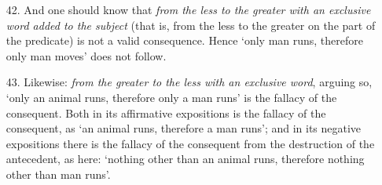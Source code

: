 \documentclass[]{article}
\begin{document}
\begin{itemize}
\item[42.] And one should know that \textit{from the less to the greater with an exclusive word added to the subject} (that is, from the less to the greater on the part of the predicate) is not a valid consequence. Hence `only man runs, therefore only man moves' does not follow.
\item[43.] Likewise: \textit{from the greater to the less with an exclusive word}, arguing so, `only an animal runs, therefore only a man runs' is the fallacy of the consequent. Both in its affirmative expositions is the fallacy of the consequent, as `an animal runs, therefore a man runs'; and in its negative expositions there is the fallacy of the consequent from the destruction of the antecedent, as here: `nothing other than an animal runs, therefore nothing other than man runs'.
\end{itemize}
\end{document}
